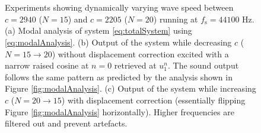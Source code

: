 \begin{figure}[ht!]
    \centering
    \\
    \vspace{-1em}\\
    \vspace{-1em}
    \vspace{-1em}\caption{Experiments showing dynamically varying wave speed between $c = 2940$ ($N = 15$) and $c = 2205$ ($N = 20$) running at $f_\text{s} = 44100$ Hz. (a) Modal analysis of system \eqref{eq:totalSystem} using \eqref{eq:modalAnalysis}. (b) Output of the system while decreasing $c$ ($N = 15 \rightarrow 20$) without displacement correction excited with a narrow raised cosine at $n=0$ retrieved at $u_1^n$. The sound output follows the same pattern as predicted by the analysis shown in Figure \ref{fig:modalAnalysis}. (c) Output of the system while increasing $c$ ($N = 20 \rightarrow 15$) with displacement correction (essentially flipping Figure \ref{fig:modalAnalysis} horizontally). Higher frequencies are filtered out and prevent artefacts.}
\end{figure}

